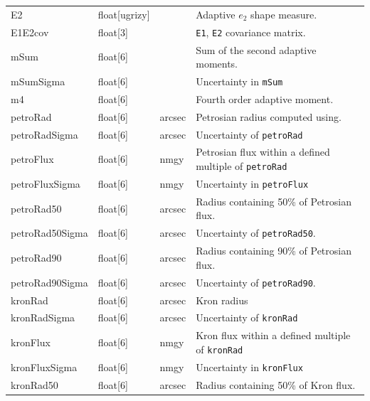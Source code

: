 \documentclass[12pt]{article}
\begin{document}
\begin{center}
\begin{longtable}{p{3cm}p{2cm}p{2cm}p{5cm}}
E2 & float[ugrizy] & ~ & Adaptive $e_2$ shape measure. \\

E1E2cov & float[3] & ~ & {\tt E1}, {\tt E2} covariance matrix. \\

mSum & float[6] & ~ & Sum of the second adaptive moments. \\

mSumSigma & float[6] & ~ & Uncertainty in {\tt mSum} \\

m4 & float[6] & ~ & Fourth order adaptive moment. \\


petroRad & float[6] & arcsec & Petrosian radius computed using. \\

petroRadSigma & float[6] & arcsec & Uncertainty of {\tt petroRad} \\

petroFlux & float[6] & nmgy & Petrosian flux within a defined multiple of {\tt petroRad} \\

petroFluxSigma & float[6] & nmgy & Uncertainty in {\tt petroFlux} \\

petroRad50 & float[6] & arcsec & Radius containing 50\% of Petrosian flux. \\

petroRad50Sigma & float[6] & arcsec & Uncertainty of {\tt petroRad50}. \\

petroRad90 & float[6] & arcsec & Radius containing 90\% of Petrosian flux. \\

petroRad90Sigma & float[6] & arcsec & Uncertainty of {\tt petroRad90}. \\


kronRad & float[6] & arcsec & Kron radius \\

kronRadSigma & float[6] & arcsec & Uncertainty of {\tt kronRad} \\

kronFlux & float[6] & nmgy & Kron flux within a defined multiple of {\tt kronRad} \\

kronFluxSigma & float[6] & nmgy & Uncertainty in {\tt kronFlux} \\

kronRad50 & float[6] & arcsec & Radius containing 50\% of Kron flux. \\


\end{longtable}
\end{center}
\end{document}
